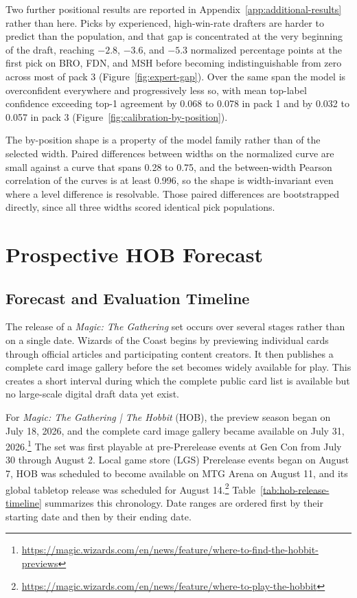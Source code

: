 \documentclass[11pt]{article}
\numberwithin{equation}{section}
\begin{document}
Two further positional results are reported in
Appendix~\ref{app:additional-results} rather than here. Picks by experienced,
high-win-rate drafters are harder to predict than the population, and that gap is
concentrated at the very beginning of the draft, reaching $-2.8$, $-3.6$, and
$-5.3$ normalized percentage points at the first pick on BRO, FDN, and MSH before
becoming indistinguishable from zero across most of pack 3
(Figure~\ref{fig:expert-gap}). Over the same span the model is overconfident
everywhere and progressively less so, with mean top-label confidence exceeding
top-1 agreement by 0.068 to 0.078 in pack 1 and by 0.032 to 0.057 in pack 3
(Figure~\ref{fig:calibration-by-position}).

The by-position shape is a property of the model family rather than of the
selected width. Paired differences between widths on the normalized curve are
small against a curve that spans 0.28 to 0.75, and the between-width Pearson
correlation of the curves is at least 0.996, so the shape is width-invariant even
where a level difference is resolvable. Those paired differences are bootstrapped
directly, since all three widths scored identical pick populations.

\section{Prospective HOB Forecast}
\label{sec:hob-forecast}

\subsection{Forecast and Evaluation Timeline}
\label{sec:hob-timeline}

The release of a \emph{Magic: The Gathering} set occurs over several stages rather than on a single date. Wizards of the Coast begins by previewing individual cards through official articles and participating content creators. It then publishes a complete card image gallery before the set becomes widely available for play. This creates a short interval during which the complete public card list is available but no large-scale digital draft data yet exist.

For \emph{Magic: The Gathering | The Hobbit} (HOB), the preview season began on July 18, 2026, and the complete card image gallery became available on July 31, 2026.\footnote{\url{https://magic.wizards.com/en/news/feature/where-to-find-the-hobbit-previews}} The set was first playable at pre-Prerelease events at Gen Con from July 30 through August 2. Local game store (LGS) Prerelease events began on August 7, HOB was scheduled to become available on MTG Arena on August 11, and its global tabletop release was scheduled for August 14.\footnote{\url{https://magic.wizards.com/en/news/feature/where-to-play-the-hobbit}} Table~\ref{tab:hob-release-timeline} summarizes this chronology. Date ranges are ordered first by their starting date and then by their ending date.
\end{document}
